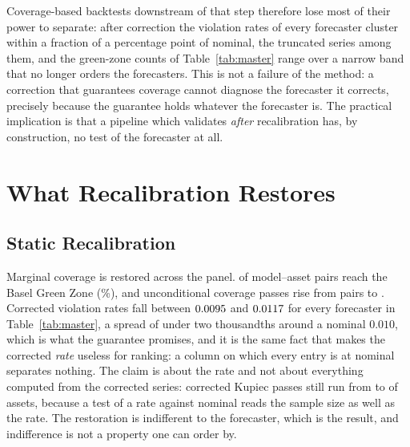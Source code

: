 \documentclass[preprint,11pt,authoryear]{elsarticle}
\newcommand{\1}{\boldsymbol{1}}
\begin{document}
Coverage-based backtests downstream of that step therefore lose most of their
power to separate: after correction the violation rates of every forecaster
cluster within a fraction of a percentage point of nominal, the truncated series
among them, and the green-zone counts of Table~\ref{tab:master} range over a
narrow band that no longer orders the forecasters. This is not a failure of the
method: a correction that guarantees coverage cannot
diagnose the forecaster it corrects, precisely because the guarantee holds
whatever the forecaster is. The practical implication is that a pipeline which
validates \emph{after} recalibration has, by construction, no test of the
forecaster at all.

\section{What Recalibration Restores}
\label{sec:recal}

\subsection{Static Recalibration}
\label{sec:recalib}

Marginal coverage is restored across the panel. \nMainGreen{} of \nMainPairs{}
model--asset pairs reach the Basel Green Zone (\nMainGreenPct\%), and
unconditional coverage passes rise from \nMainKupiecRawPasses{} pairs to
\nMainKupiecCorPasses. Corrected violation rates fall between $0.0095$ and $0.0117$ for
every forecaster in Table~\ref{tab:master}, a spread of under two thousandths
around a nominal $0.010$, which is what the
guarantee promises, and it is the same fact that makes the corrected \emph{rate}
useless for ranking: a column on which every entry is at nominal separates
nothing. The claim is about the rate and not about everything computed from the
corrected series: corrected Kupiec passes still run from \nMainCorKupLo{} to
\nMainCorKupHi{} of \nMainAssets{} assets, because a test of a rate against
nominal reads the sample size as well as the rate. The restoration is indifferent to the forecaster, which is the result,
and indifference is not a property one can order by.
\end{document}
